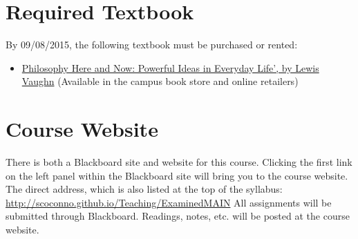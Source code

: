 \documentclass[11pt,article,oneside]{memoir}
\begin{document}
\section{Required Textbook}

By 09/08/2015, the following textbook must be purchased or rented:

\begin{itemize}
\item
  \href{http://www.amazon.com/Philosophy-Here-Now-Powerful-Everyday/dp/0199765227}{Philosophy
  Here and Now: Powerful Ideas in Everyday Life', by Lewis Vaughn}
  (Available in the campus book store and online retailers)
\end{itemize}


\section{Course Website}
There is both a Blackboard site and website for this course. Clicking the first link on the left panel within the Blackboard site will bring you to the course website. The direct address, which is also listed at the top of the syllabus: \href{http://scoconno.github.io/Teaching/ExaminedMAIN}{http://scoconno.github.io/Teaching/ExaminedMAIN}
All assignments will be submitted through Blackboard. Readings, notes, etc. will be posted at the course website. 
\end{document}
